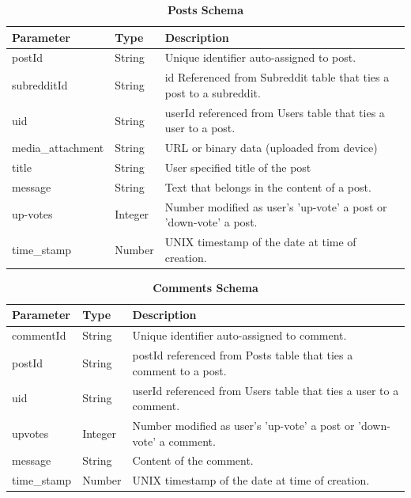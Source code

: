 \documentclass[12pt,fleqn]{article}
\begin{document}
\begin{table}[H]
\caption{\bf Posts Schema}
\begin{tabularx}{\textwidth}{p{4cm}p{2cm}X}
\toprule {\bf Parameter} & {\bf Type} & {\bf Description}\\
\midrule
postId & String & Unique identifier auto-assigned to post.\\
subredditId & String & id Referenced from Subreddit table that ties a post to a subreddit. \\
uid & String & userId referenced from Users table that ties a user to a post.\\
media\_attachment & String & URL or binary data (uploaded from device) \\
title & String & User specified title of the post \\
message & String & Text that belongs in the content of a post. \\
up-votes & Integer & Number modified as user's 'up-vote' a post or 'down-vote' a post. \\
time\_stamp & Number & UNIX timestamp of the  date at time of creation. \\
\bottomrule
\end{tabularx}
\end{table}

\begin{table}[H]
\caption{\bf Comments Schema}
\begin{tabularx}{\textwidth}{p{4cm}p{2cm}X}
\toprule {\bf Parameter} & {\bf Type} & {\bf Description}\\
\midrule
commentId & String & Unique identifier auto-assigned to comment. \\
postId & String & postId referenced from Posts table that ties a comment to a post.\\
uid & String & userId referenced from Users table that ties a user to a comment.\\
upvotes & Integer & Number modified as user's 'up-vote' a post or 'down-vote' a comment. \\
message & String & Content of the comment. \\
time\_stamp & Number & UNIX timestamp of the  date at time of creation. \\
\bottomrule
\end{tabularx}
\end{table}
\end{document}
